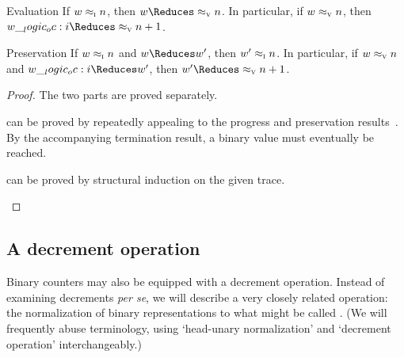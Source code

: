 \begin{corollary}
  \leavevmode
  \begin{thinthmdescription}
  \item[Evaluation]
    If $w \approx\sb{\text{\normalfont\scshape i}} n$, then $w \Reduces\aval{}{n}$.
    In particular, if $w \approx\sb{\text{\normalfont\scshape v}} n$, then $w \oc i \Reduces\aval{}{n+1}$.
  \item[Preservation]
    If $w \approx\sb{\text{\normalfont\scshape i}} n$ and $w \Reduces w'$, then $w' \approx\sb{\text{\normalfont\scshape i}} n$.
    In particular, if $w \approx\sb{\text{\normalfont\scshape v}} n$ and $w \oc i \Reduces w'$, then $w' \Reduces\aval{}{n+1}$.
  \end{thinthmdescription}
\end{corollary}
\begin{proof}
  The two parts are proved separately.
  \begin{description}[labelsep=0.35em]
  \item[Evaluation] can be proved by repeatedly appealing to the progress and preservation results~.
    By the accompanying termination result, a binary value must eventually be reached.
  \item[Preservation] can be proved by structural induction on the given trace.
  \qedhere
  \end{description}
\end{proof}


\subsection{A decrement operation}

Binary counters may also be equipped with a decrement operation.
Instead of examining decrements \emph{per se}, we will describe a very closely related operation: the normalization of binary representations to what might be called .
(We will frequently abuse terminology, using \enquote*{head-unary normalization} and \enquote*{decrement operation} interchangeably.)


